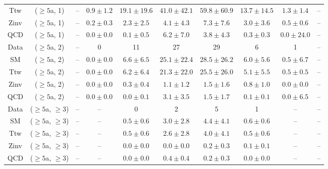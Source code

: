\begin{table}[h!]
{\begin{tabular}{cccccccccc}
	Ttw & ($\ge5$a, 1) & -- & $0.9\pm 1.2$ & $19.1\pm 19.6$ & $41.0\pm 42.1$ & $59.8\pm 60.9$ & $13.7\pm 14.5$ & $1.3\pm 1.4$ & -- \\[0.5ex] 
	Zinv & ($\ge5$a, 1) & -- & $0.2\pm 0.3$ & $2.3\pm 2.5$ & $4.1\pm 4.3$ & $7.3\pm 7.6$ & $3.0\pm 3.6$ & $0.5\pm 0.6$ & -- \\[0.5ex] 
	QCD & ($\ge5$a, 1) & -- & $0.0\pm 0.0$ & $0.1\pm 0.5$ & $6.2\pm 7.0$ & $3.8\pm 4.3$ & $0.3\pm 0.3$ & $0.0\pm 24.0$ & -- \\[0.5ex] 
	Data & ($\ge5$a, 2) & -- & 0 & 11 & 27 & 29 & 6 & 1 & -- \\[0.5ex] 
	SM & ($\ge5$a, 2) & -- & $0.0\pm 0.0$ & $6.6\pm 6.5$ & $25.1\pm 22.4$ & $28.5\pm 26.2$ & $6.0\pm 5.6$ & $0.5\pm 6.7$ & -- \\[0.5ex] 
	Ttw & ($\ge5$a, 2) & -- & $0.0\pm 0.0$ & $6.2\pm 6.4$ & $21.3\pm 22.0$ & $25.5\pm 26.0$ & $5.1\pm 5.5$ & $0.5\pm 0.5$ & -- \\[0.5ex] 
	Zinv & ($\ge5$a, 2) & -- & $0.0\pm 0.0$ & $0.3\pm 0.4$ & $1.1\pm 1.2$ & $1.5\pm 1.6$ & $0.8\pm 1.0$ & $0.0\pm 0.0$ & -- \\[0.5ex] 
	QCD & ($\ge5$a, 2) & -- & $0.0\pm 0.0$ & $0.0\pm 0.1$ & $3.1\pm 3.5$ & $1.5\pm 1.7$ & $0.1\pm 0.1$ & $0.0\pm 6.5$ & -- \\[0.5ex] 
	Data & ($\ge5$a, $\ge3$) & -- & -- & 0 & 2 & 5 & 1 & -- & -- \\[0.5ex] 
	SM & ($\ge5$a, $\ge3$) & -- & -- & $0.5\pm 0.6$ & $3.0\pm 2.8$ & $4.4\pm 4.1$ & $0.6\pm 0.6$ & -- & -- \\[0.5ex] 
	Ttw & ($\ge5$a, $\ge3$) & -- & -- & $0.5\pm 0.6$ & $2.6\pm 2.8$ & $4.0\pm 4.1$ & $0.5\pm 0.6$ & -- & -- \\[0.5ex] 
	Zinv & ($\ge5$a, $\ge3$) & -- & -- & $0.0\pm 0.0$ & $0.0\pm 0.0$ & $0.2\pm 0.3$ & $0.1\pm 0.1$ & -- & -- \\[0.5ex] 
	QCD & ($\ge5$a, $\ge3$) & -- & -- & $0.0\pm 0.0$ & $0.4\pm 0.4$ & $0.2\pm 0.3$ & $0.0\pm 0.0$ & -- & -- \\[0.5ex] 
	\hline
	\hline
\end{tabular}}
\end{table}
